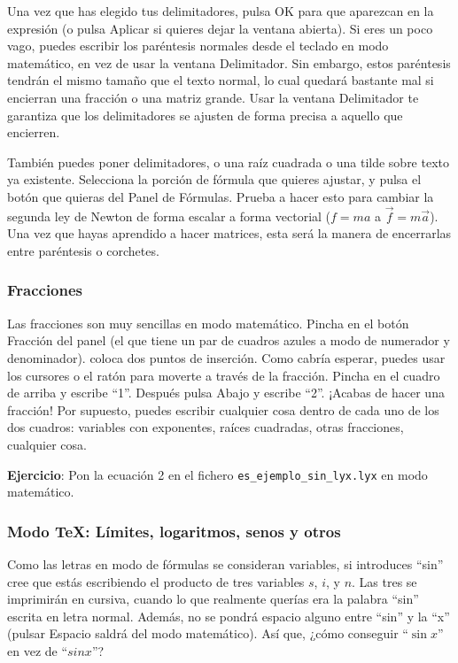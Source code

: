 Una vez que has elegido tus delimitadores, pulsa \textsf{OK} para
que aparezcan en la expresión (o pulsa \textsf{Aplicar} si quieres
dejar la ventana abierta). Si eres un poco vago, puedes escribir los
paréntesis normales desde el teclado en modo matemático, en vez de
usar la ventana \textsf{Delimitador}. Sin embargo, estos paréntesis
tendrán el mismo tamaño que el texto normal, lo cual quedará bastante
mal si encierran una fracción o una matriz grande. Usar la ventana
\textsf{Delimitador} te garantiza que los delimitadores se ajusten
de forma precisa a aquello que encierren.

También puedes poner delimitadores, o una raíz cuadrada o una tilde
sobre texto ya existente. Selecciona la porción de fórmula que quieres
ajustar, y pulsa el botón que quieras del \textsf{Panel de Fórmulas}.
Prueba a hacer esto para cambiar la segunda ley de Newton de forma
escalar a forma vectorial ($f=ma$ a $\overrightarrow{f}=m\overrightarrow{a}$).
Una vez que hayas aprendido a hacer matrices, esta será la manera
de encerrarlas entre paréntesis o corchetes.


\subsubsection{Fracciones}

Las fracciones son muy sencillas en modo matemático. Pincha en el
botón \textsf{Fracción} del panel (el que tiene un par de cuadros
azules a modo de numerador y denominador). \LyX{} coloca dos puntos
de inserción. Como cabría esperar, puedes usar los cursores o el ratón
para moverte a través de la fracción. Pincha en el cuadro de arriba
y escribe {}``1''. Después pulsa \textsf{Abajo} y escribe {}``2''.
¡Acabas de hacer una fracción! Por supuesto, puedes escribir cualquier
cosa dentro de cada uno de los dos cuadros: variables con exponentes,
raíces cuadradas, otras fracciones, cualquier cosa.

\textbf{Ejercicio}: Pon la ecuación 2 en el fichero \texttt{es\_ejemplo\_sin\_lyx.lyx}
en modo matemático.


\subsubsection{Modo \TeX{}: Límites, logaritmos, senos y otros}

Como las letras en modo de fórmulas se consideran variables, si introduces
{}``sin'' \LyX{} cree que estás escribiendo el producto de tres
variables $s$, $i$, y $n$. Las tres se imprimirán en cursiva, cuando
lo que realmente querías era la palabra {}``sin'' escrita en letra
normal. Además, no se pondrá espacio alguno entre {}``sin'' y la
{}``x'' (pulsar \textsf{Espacio} saldrá del modo matemático). Así
que, ¿cómo conseguir {}``$\sin x$'' en vez de {}``$sinx$''?

